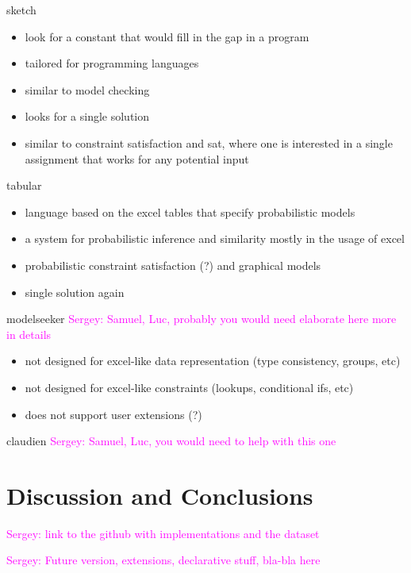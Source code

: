 \documentclass{ecai}
\newcommand{\sergey}[1]{\textcolor{magenta}{{\sc Sergey:} #1}\xspace}
\begin{document}
sketch \cite{sketch}
\begin{itemize}
  \item look for a constant that would fill in the gap in a program
  \item tailored for programming languages
  \item similar to model checking
  \item looks for a single solution
  \item similar to constraint satisfaction and sat, where one is interested in a single assignment that works for any potential input
\end{itemize}

tabular \cite{tabular}
\begin{itemize}
  \item language based on the excel tables that specify probabilistic models
  \item a system for probabilistic inference and similarity mostly in the usage of excel
  \item probabilistic constraint satisfaction (?) and graphical models
  \item single solution again
\end{itemize}

modelseeker \cite{modelseeker} \sergey{Samuel, Luc, probably you would need elaborate here more in details}

\begin{itemize}
  \item not designed for excel-like data representation (type consistency, groups, etc)
  \item not designed for excel-like constraints (lookups, conditional ifs, etc)
  \item does not support user extensions (?)
\end{itemize}

claudien \cite{claudien} \sergey{Samuel, Luc, you would need to help with this one}

\section{Discussion and Conclusions}
\sergey{link to the github with implementations and the dataset}


\sergey{Future version, extensions, declarative stuff, bla-bla here}



\end{document}
